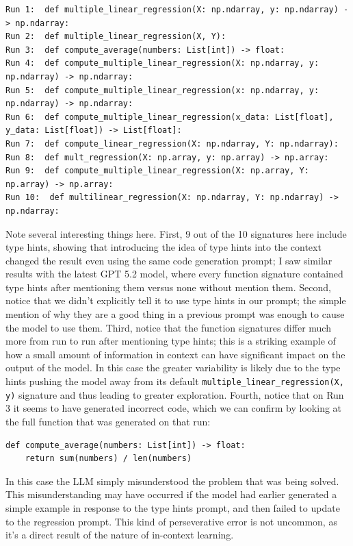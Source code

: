 \begin{lstlisting}
Run 1:  def multiple_linear_regression(X: np.ndarray, y: np.ndarray) -> np.ndarray:
Run 2:  def multiple_linear_regression(X, Y):
Run 3:  def compute_average(numbers: List[int]) -> float:
Run 4:  def compute_multiple_linear_regression(X: np.ndarray, y: np.ndarray) -> np.ndarray:
Run 5:  def compute_multiple_linear_regression(x: np.ndarray, y: np.ndarray) -> np.ndarray:
Run 6:  def compute_multiple_linear_regression(x_data: List[float], y_data: List[float]) -> List[float]:
Run 7:  def compute_linear_regression(X: np.ndarray, Y: np.ndarray):
Run 8:  def mult_regression(X: np.array, y: np.array) -> np.array:
Run 9:  def compute_multiple_linear_regression(X: np.array, Y: np.array) -> np.array:
Run 10:  def multilinear_regression(X: np.ndarray, Y: np.ndarray) -> np.ndarray:
\end{lstlisting}

Note several interesting things here.
First, 9 out of the 10 signatures here include type hints, showing that introducing the idea of type hints into the context changed the result even using the same code generation prompt; I saw similar results with the latest GPT 5.2 model, where every function signature contained type hints after mentioning them versus none without mention them.
Second, notice that we didn't explicitly tell it to use type hints in our prompt; the simple mention of why they are a good thing in a previous prompt was enough to cause the model to use them.
Third, notice that the function signatures differ much more from run to run after mentioning type hints; this is a striking example of how a small amount of information in context can have significant impact on the output of the model. In this case the greater variability is likely due to the type hints pushing the model away from its default \texttt{multiple\_linear\_regression(X, y)} signature and thus leading to greater exploration.
Fourth, notice that on Run 3 it seems to have generated incorrect code, which we can confirm by looking at the full function that was generated on that run:

\begin{lstlisting}
def compute_average(numbers: List[int]) -> float:
    return sum(numbers) / len(numbers)
\end{lstlisting}

In this case the LLM simply misunderstood the problem that was being solved.
This misunderstanding may have occurred if the model had earlier generated a simple example in response to the type hints prompt, and then failed to update to the regression prompt.
This kind of perseverative error is not uncommon, as it's a direct result of the nature of in-context learning.

